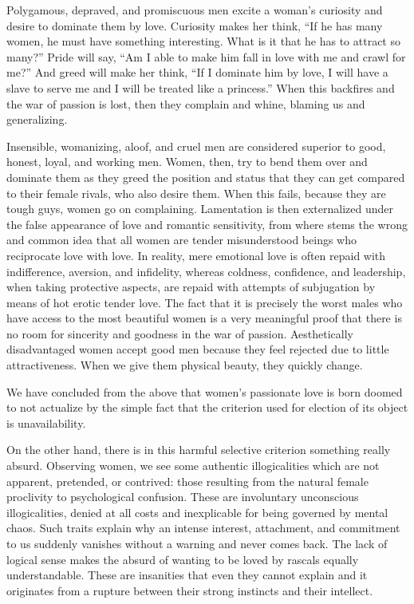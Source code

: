 
\par Polygamous, depraved, and promiscuous men excite a woman's curiosity and desire to dominate them by love. Curiosity makes her think, \enquote{If he has many women, he must have something interesting. What is it that he has to attract so many?} Pride will say, \enquote{Am I able to make him fall in love with me and crawl for me?} And greed will make her think, \enquote{If I dominate him by love, I will have a slave to serve me and I will be treated like a princess.} When this backfires and the war of passion is lost, then they complain and whine, blaming us and generalizing.


\par Insensible, womanizing, aloof, and cruel men are considered superior to good, honest, loyal, and working men. Women, then, try to bend them over and dominate them as they greed the position and status that they can get compared to their female rivals, who also desire them. When this fails, because they are tough guys, women go on complaining. Lamentation is then externalized under the false appearance of love and romantic sensitivity, from where stems the wrong and common idea that all women are tender misunderstood beings who reciprocate love with love. In reality, mere emotional love is often repaid with indifference, aversion, and infidelity, whereas coldness, confidence, and leadership, when taking protective aspects, are repaid with attempts of subjugation by means of hot erotic tender love. The fact that it is precisely the worst males who have access to the most beautiful women is a very meaningful proof that there is no room for sincerity and goodness in the war of passion. Aesthetically disadvantaged women accept good men because they feel rejected due to little attractiveness. When we give them physical beauty, they quickly change.

\par We have concluded from the above that women's passionate love is born doomed to not actualize by the simple fact that the criterion used for election of its object is unavailability.

\par On the other hand, there is in this harmful selective criterion something really absurd. Observing women, we see some authentic illogicalities which are not apparent, pretended, or contrived: those resulting from the natural female proclivity to psychological confusion. These are involuntary unconscious illogicalities, denied at all costs and inexplicable for being governed by mental chaos. Such traits explain why an intense interest, attachment, and commitment to us suddenly vanishes without a warning and never comes back. The lack of logical sense makes the absurd of wanting to be loved by rascals equally understandable. These are insanities that even they cannot explain and it originates from a rupture between their strong instincts and their intellect.


